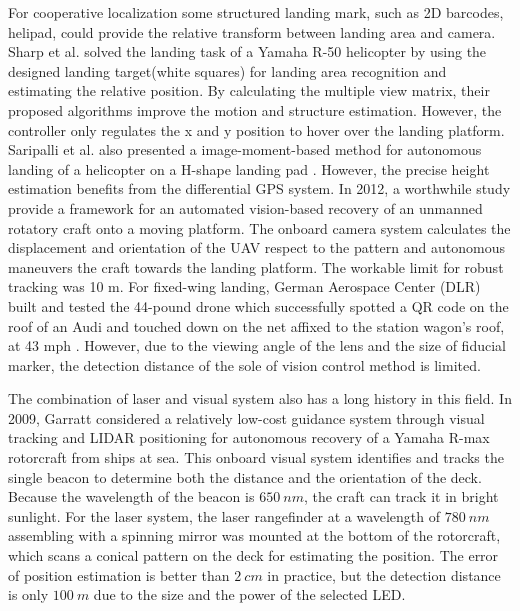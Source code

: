 For cooperative localization some structured landing mark, such as 2D barcodes, helipad, could provide the relative transform between landing area and camera. Sharp et al. \cite{Sharp2001} solved the landing task of a Yamaha R-50 helicopter by using the designed landing target(white squares) for landing area recognition and estimating the relative position. By calculating the multiple view matrix, their proposed algorithms\cite{Shakernia2002} improve the motion and structure estimation. However, the controller only regulates the x and y position to hover over the landing platform. Saripalli et al. also presented a image-moment-based method for autonomous landing of a helicopter on a H-shape landing pad \cite{Saripalli2003}. However, the precise height estimation benefits from the differential GPS system. In 2012, a worthwhile study \cite{richardsonautomated2013} provide a framework for an automated vision-based recovery of an unmanned rotatory craft onto a moving platform. The onboard camera system calculates the displacement and orientation of the UAV respect to the pattern and autonomous maneuvers the craft towards the landing platform. The workable limit for robust tracking was 10 m. For fixed-wing landing, German Aerospace Center (DLR) built and tested the 44-pound drone which successfully spotted a QR code on the roof of an Audi and touched down on the net affixed to the station wagon’s roof, at 43 mph \cite{DLR_Landing}. However, due to the viewing angle of the lens and the size of fiducial marker, the detection distance of the sole of vision control method is limited.



The combination of laser and visual system also has a long history in this field. In 2009, Garratt \cite{garrattvisual2009} considered a relatively low-cost guidance system through visual tracking and LIDAR positioning for autonomous recovery of a Yamaha R-max rotorcraft from ships at sea. This onboard visual system identifies and tracks the single beacon to determine both the distance and the orientation of the deck. Because the wavelength of the beacon is $650\ nm$, the craft can track it in bright sunlight. For the laser system, the laser rangefinder at a wavelength of $780\ nm$ assembling with a spinning mirror was mounted at the bottom of the rotorcraft, which scans a conical pattern on the deck for estimating the position. The error of position estimation is better than $2\ cm$ in practice, but the detection distance is only $100\ m$ due to the size and the power of the selected LED. 

